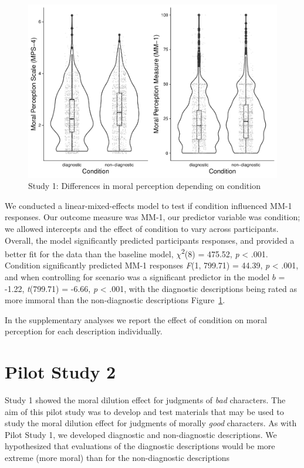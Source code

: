 \documentclass[
  english,
  man,floatsintext]{apa7}
\begin{document}
\begin{figure}
\centering
\includegraphics{moral_dilution_in_chunks_files/figure-latex/S1bothconditionplot-1.pdf}
\caption{\label{fig:S1bothconditionplot}Study 1: Differences in moral perception depending on condition}
\end{figure}

We conducted a linear-mixed-effects model to test if condition influenced MM-1 responses. Our outcome measure was MM-1, our predictor variable was condition; we allowed intercepts and the effect of condition to vary across participants. Overall, the model significantly predicted participants responses, and provided a better fit for the data than the baseline model, \(\chi\)\textsuperscript{2}(8) = 475.52, \emph{p} \textless{} .001. Condition significantly predicted MM-1 responses \emph{F}(1, 799.71) = 44.39, \emph{p} \textless{} .001, and when controlling for scenario was a significant predictor in the model \(b\) = -1.22, \emph{t}(799.71) = -6.66, \emph{p} \textless{} .001, with the diagnostic descriptions being rated as more immoral than the non-diagnostic descriptions Figure~\ref{fig:S1bothconditionplot}.

In the supplementary analyses we report the effect of condition on moral perception for each description individually.

\hypertarget{pilot-study-2}{%
\section{Pilot Study 2}\label{pilot-study-2}}

Study 1 showed the moral dilution effect for judgments of \emph{bad} characters. The aim of this pilot study was to develop and test materials that may be used to study the moral dilution effect for judgments of morally \emph{good} characters. As with Pilot Study 1, we developed diagnostic and non-diagnostic descriptions. We hypothesized that evaluations of the diagnostic descriptions would be more extreme (more moral) than for the non-diagnostic descriptions
\end{document}
